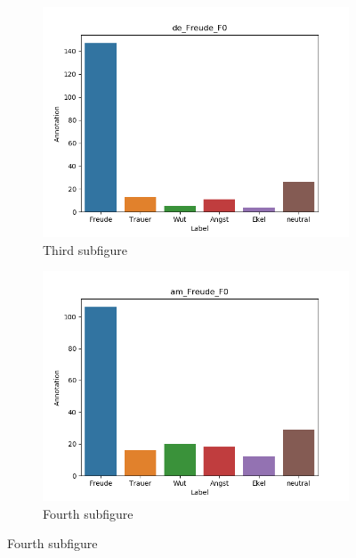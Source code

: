 \documentclass[11pt,a4paper,headsepline,twoside,toc=bibliography]{scrreprt}
\begin{document}
\begin{figure}[t!]
	\medskip
	\begin{subfigure}{0.48\textwidth}
		\includegraphics[width=\linewidth]{plots/de_Freude_F0.png}
		\caption{Third subfigure} \label{fig:de_F_F0}
	\end{subfigure}\hspace*{\fill}
	\begin{subfigure}{0.48\textwidth}
		\includegraphics[width=\linewidth]{plots/am_Freude_F0.png}
		\caption{Fourth subfigure} \label{fig:am_F_F0}
	\end{subfigure}
	

\end{figure}
\end{document}
